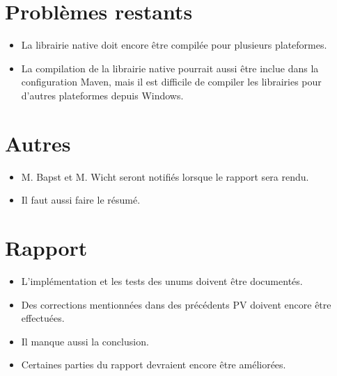 \documentclass[11pt]{meetingmins}
\begin{document}
\section{Problèmes restants}
\begin{itemize}
    \item La librairie native doit encore être compilée pour plusieurs plateformes.
    \item La compilation de la librairie native pourrait aussi être inclue dans la configuration Maven, mais il est difficile de compiler les librairies pour d'autres plateformes depuis Windows.
\end{itemize}

\section{Autres}
\begin{itemize}
    \item M. Bapst et M. Wicht seront notifiés lorsque le rapport sera rendu.
    \item Il faut aussi faire le résumé.
\end{itemize}

\section{Rapport}
\begin{itemize}
    \item L'implémentation et les tests des unums doivent être documentés.
    \item Des corrections mentionnées dans des précédents PV doivent encore être effectuées.
    \item Il manque aussi la conclusion.
    \item Certaines parties du rapport devraient encore être améliorées.
\end{itemize}
\end{document}
